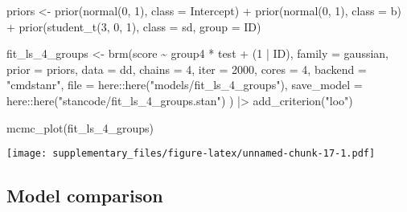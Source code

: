 \documentclass[
  man,floatsintext]{apa7}
\newenvironment{Shaded}{\begin{snugshade}}{\end{snugshade}}
\newcommand{\AttributeTok}[1]{\textcolor[rgb]{0.77,0.63,0.00}{#1}}
\newcommand{\DecValTok}[1]{\textcolor[rgb]{0.00,0.00,0.81}{#1}}
\newcommand{\FunctionTok}[1]{\textcolor[rgb]{0.00,0.00,0.00}{#1}}
\newcommand{\NormalTok}[1]{#1}
\newcommand{\OtherTok}[1]{\textcolor[rgb]{0.56,0.35,0.01}{#1}}
\newcommand{\SpecialCharTok}[1]{\textcolor[rgb]{0.00,0.00,0.00}{#1}}
\newcommand{\StringTok}[1]{\textcolor[rgb]{0.31,0.60,0.02}{#1}}
\begin{document}
\begin{Shaded}
\begin{Highlighting}[]
\NormalTok{priors }\OtherTok{\textless{}{-}} \FunctionTok{prior}\NormalTok{(}\FunctionTok{normal}\NormalTok{(}\DecValTok{0}\NormalTok{, }\DecValTok{1}\NormalTok{), }\AttributeTok{class =}\NormalTok{ Intercept) }\SpecialCharTok{+}
  \FunctionTok{prior}\NormalTok{(}\FunctionTok{normal}\NormalTok{(}\DecValTok{0}\NormalTok{, }\DecValTok{1}\NormalTok{), }\AttributeTok{class =}\NormalTok{ b) }\SpecialCharTok{+}
  \FunctionTok{prior}\NormalTok{(}\FunctionTok{student\_t}\NormalTok{(}\DecValTok{3}\NormalTok{, }\DecValTok{0}\NormalTok{, }\DecValTok{1}\NormalTok{), }\AttributeTok{class =}\NormalTok{ sd, }\AttributeTok{group =}\NormalTok{ ID) }

\NormalTok{fit\_ls\_4\_groups }\OtherTok{\textless{}{-}} \FunctionTok{brm}\NormalTok{(score }\SpecialCharTok{\textasciitilde{}}\NormalTok{ group4 }\SpecialCharTok{*}\NormalTok{ test }\SpecialCharTok{+}\NormalTok{ (}\DecValTok{1} \SpecialCharTok{|}\NormalTok{ ID),}
                      \AttributeTok{family =}\NormalTok{ gaussian,}
                      \AttributeTok{prior =}\NormalTok{ priors,}
                      \AttributeTok{data =}\NormalTok{ dd,}
                      \AttributeTok{chains =} \DecValTok{4}\NormalTok{, }\AttributeTok{iter =} \DecValTok{2000}\NormalTok{, }\AttributeTok{cores =} \DecValTok{4}\NormalTok{,}
                      \AttributeTok{backend =} \StringTok{"cmdstanr"}\NormalTok{,}
                      \AttributeTok{file =}\NormalTok{ here}\SpecialCharTok{::}\FunctionTok{here}\NormalTok{(}\StringTok{"models/fit\_ls\_4\_groups"}\NormalTok{),}
                      \AttributeTok{save\_model =}\NormalTok{ here}\SpecialCharTok{::}\FunctionTok{here}\NormalTok{(}\StringTok{"stancode/fit\_ls\_4\_groups.stan"}\NormalTok{)}
\NormalTok{                      ) }\SpecialCharTok{|\textgreater{}}
  \FunctionTok{add\_criterion}\NormalTok{(}\StringTok{"loo"}\NormalTok{)}
\end{Highlighting}
\end{Shaded}

\begin{Shaded}
\begin{Highlighting}[]
\FunctionTok{mcmc\_plot}\NormalTok{(fit\_ls\_4\_groups)}
\end{Highlighting}
\end{Shaded}

\texttt{[image: supplementary\_files/figure-latex/unnamed-chunk-17-1.pdf]}

\hypertarget{model-comparison}{%
\subsection{Model comparison}\label{model-comparison}}
\end{document}
